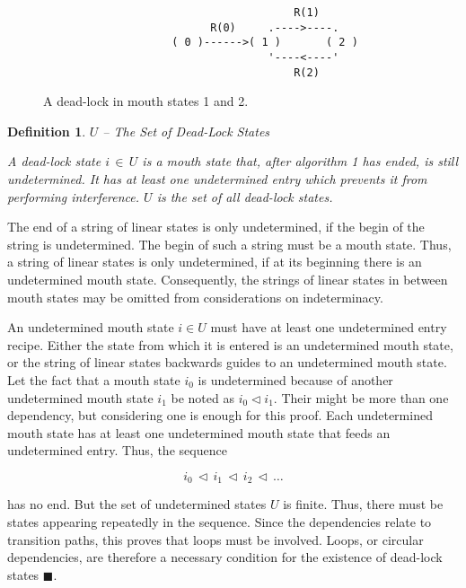 \documentclass[12pt,a4paper]{scrartcl}
\newtheorem{definition}{Definition}
\begin{document}
\begin{figure}[htbp] \leavevmode
\begin{verbatim}
                                       R(1)
                          R(0)     .---->----.
                    ( 0 )------>( 1 )       ( 2 )
                                   '----<----'
                                       R(2)

\end{verbatim}
\caption{A dead-lock in mouth states 1 and 2.}
\end{figure}

\begin{definition} $U$ -- The Set of Dead-Lock States

A dead-lock state $i\,\in\,U$ is a mouth state that, after algorithm 1 has
ended, is still undetermined. It has at least one undetermined entry which
prevents it from performing interference. $U$ is the set of all dead-lock
states.

\end{definition}

The end of a string of linear states is only undetermined, if the begin of the
string is undetermined. The begin of such a string must be a mouth state. Thus,
a string of linear states is only undetermined, if at its beginning there is an
undetermined mouth state. Consequently, the strings of linear states in between
mouth states may be omitted from considerations on indeterminacy.

An undetermined mouth state $i \in U$ must have at least one undetermined entry
recipe. Either the state from which it is entered is an undetermined mouth state, 
or the string of linear states backwards guides to an undetermined mouth state. 
Let the fact that a mouth state $i_0$ is undetermined because of another
undetermined mouth state $i_1$ be noted as $i_0 \vartriangleleft i_1$. Their might
be more than one dependency, but considering one is enough for this proof. Each
undetermined mouth state has at least one undetermined mouth state that feeds
an undetermined entry. Thus, the sequence 

\begin{equation}
    i_0\,\vartriangleleft\,i_1\,\vartriangleleft\,i_2\,\vartriangleleft\,\ldots
\end{equation}

has no end. But the set of undetermined states $U$ is finite. Thus, there must
be states appearing repeatedly in the sequence. Since the dependencies relate
to transition paths, this proves that loops must be involved. Loops, or circular
dependencies, are therefore a necessary condition for the existence of
dead-lock states $\blacksquare$. 
\end{document}
